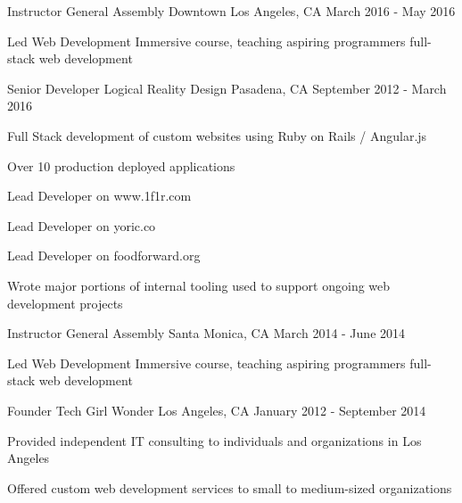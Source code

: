 

\begin{cventries}

  \cventry
    {Instructor} %
    {General Assembly} %
    {Downtown Los Angeles, CA} %
    {March 2016 - May 2016} %
    {
      \begin{cvitems} %
        \item {Led Web Development Immersive course, teaching aspiring programmers full-stack web development}
      \end{cvitems}
    }

  \cventry
    {Senior Developer} %
    {Logical Reality Design} %
    {Pasadena, CA} %
    {September 2012 - March 2016} %
    {
      \begin{cvitems} %
        \item {Full Stack development of custom websites using Ruby on Rails / Angular.js}
        \item {Over 10 production deployed applications}
        \item {Lead Developer on www.1f1r.com}
        \item {Lead Developer on yoric.co}
        \item {Lead Developer on foodforward.org}
        \item {Wrote major portions of internal tooling used to support ongoing web development projects}
      \end{cvitems}
    }
  \cventry
    {Instructor} %
    {General Assembly} %
    {Santa Monica, CA} %
    {March 2014 - June 2014} %
    {
      \begin{cvitems} %
        \item {Led Web Development Immersive course, teaching aspiring programmers full-stack web development}
      \end{cvitems}
    }
  \cventry
    {Founder} %
    {Tech Girl Wonder} %
    {Los Angeles, CA} %
    {January 2012 - September 2014} %
    {
      \begin{cvitems} %
        \item {Provided independent IT consulting to individuals and organizations in Los Angeles}
        \item {Offered custom web development services to small to medium-sized organizations}
      \end{cvitems}
    }


\end{cventries}
